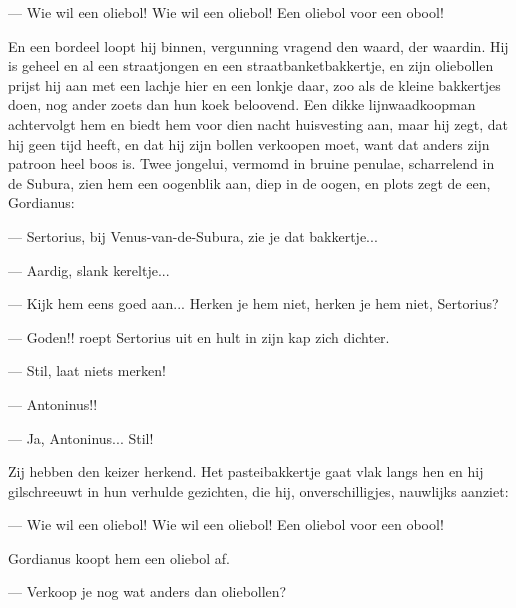 \documentclass[a4paper, 12pt, oneside, dutch]{article}
\begin{document}
--- Wie wil een oliebol! Wie wil een oliebol! Een oliebol voor een obool!

En een bordeel loopt hij binnen, vergunning vragend den waard, der waardin. Hij is geheel en al een straatjongen en een straatbanketbakkertje, en zijn oliebollen prijst hij aan met een lachje hier en een lonkje daar, zoo als de kleine bakkertjes doen, nog ander zoets dan hun koek beloovend. Een dikke lijnwaadkoopman achtervolgt hem en biedt hem voor dien nacht huisvesting aan, maar hij zegt, dat hij geen tijd heeft, en dat hij zijn bollen verkoopen moet, want dat anders zijn patroon heel boos is. Twee jongelui, vermomd in bruine penulae, scharrelend in de Subura, zien hem een oogenblik aan, diep in de oogen, en plots zegt de een, Gordianus:

--- Sertorius, bij Venus-van-de-Subura, zie je dat bakkertje...

--- Aardig, slank kereltje...

--- Kijk hem eens goed aan... Herken je hem niet, herken je hem niet, Sertorius?

--- Goden!! roept Sertorius uit en hult in zijn kap zich dichter.

--- Stil, laat niets merken!

--- Antoninus!!

--- Ja, Antoninus... Stil!

Zij hebben den keizer herkend. Het pasteibakkertje gaat vlak langs hen en hij gilschreeuwt in hun verhulde gezichten, die hij, onverschilligjes, nauwlijks aanziet:

--- Wie wil een oliebol! Wie wil een oliebol! Een oliebol voor een obool!

Gordianus koopt hem een oliebol af.

--- Verkoop je nog wat anders dan oliebollen?
\end{document}
